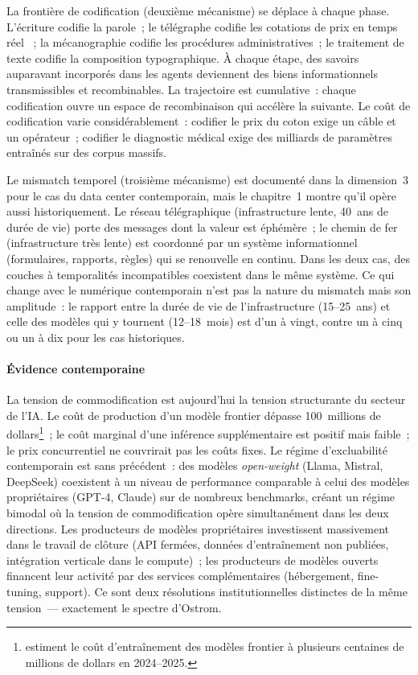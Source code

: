 La frontière de codification (deuxième mécanisme) se déplace à chaque phase. L'écriture codifie la parole~; le télégraphe codifie les cotations de prix en temps réel \parencite{steinwender_real_2018}~; la mécanographie codifie les procédures administratives~; le traitement de texte codifie la composition typographique. À chaque étape, des savoirs auparavant incorporés dans les agents deviennent des biens informationnels transmissibles et recombinables. La trajectoire est cumulative~: chaque codification ouvre un espace de recombinaison qui accélère la suivante. Le coût de codification varie considérablement~: codifier le prix du coton exige un câble et un opérateur~; codifier le diagnostic médical exige des milliards de paramètres entraînés sur des corpus massifs.

Le mismatch temporel (troisième mécanisme) est documenté dans la dimension~3 pour le cas du data center contemporain, mais le chapitre~1 montre qu'il opère aussi historiquement. Le réseau télégraphique (infrastructure lente, 40~ans de durée de vie) porte des messages dont la valeur est éphémère~; le chemin de fer (infrastructure très lente) est coordonné par un système informationnel (formulaires, rapports, règles) qui se renouvelle en continu. Dans les deux cas, des couches à temporalités incompatibles coexistent dans le même système. Ce qui change avec le numérique contemporain n'est pas la nature du mismatch mais son amplitude~: le rapport entre la durée de vie de l'infrastructure (15--25~ans) et celle des modèles qui y tournent (12--18~mois) est d'un à vingt, contre un à cinq ou un à dix pour les cas historiques.


\paragraph{Évidence contemporaine}

La tension de commodification est aujourd'hui la tension structurante du secteur de l'IA. Le coût de production d'un modèle frontier dépasse 100~millions de dollars\footnote{\textcite{cottier_rapid_2025} estiment le coût d'entraînement des modèles frontier à plusieurs centaines de millions de dollars en 2024--2025.}~; le coût marginal d'une inférence supplémentaire est positif mais faible~; le prix concurrentiel ne couvrirait pas les coûts fixes. Le régime d'excluabilité contemporain est sans précédent~: des modèles \emph{open-weight} (Llama, Mistral, DeepSeek) coexistent à un niveau de performance comparable à celui des modèles propriétaires (GPT-4, Claude) sur de nombreux benchmarks, créant un régime bimodal où la tension de commodification opère simultanément dans les deux directions. Les producteurs de modèles propriétaires investissent massivement dans le travail de clôture (API fermées, données d'entraînement non publiées, intégration verticale dans le compute)~; les producteurs de modèles ouverts financent leur activité par des services complémentaires (hébergement, fine-tuning, support). Ce sont deux résolutions institutionnelles distinctes de la même tension~--- exactement le spectre d'Ostrom.

